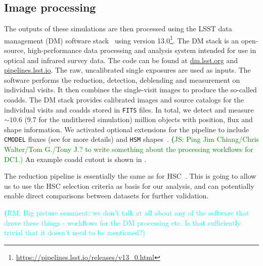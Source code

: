 \documentclass[twocolumn]{aastex62}
\newcommand{\rachel}[1]{{\textcolor{cyan}{{\textbf (RM: #1)}}}}
\newcommand{\js}[1]{{\textcolor{green}{{\textbf (JS: #1)}}}}
\begin{document}
\subsection{Image processing}
\label{sec:image_processing_pipeline}

The outputs of these simulations are then processed using the LSST data management (DM) software stack~\citep{Overview,ScienceBook,WhitePaper,2018PASJ...70S...5B,2015arXiv151207914J} using version 13.0\footnote{\url{https://pipelines.lsst.io/releases/v13_0.html}}. The DM stack is an open-source, high-performance data processing and analysis system intended for use in optical and infrared survey data. The code can be found at \url{dm.lsst.org} and \url{pipelines.lsst.io}. The raw, uncalibrated single exposures are used as inputs. The software performs the reduction, detection, deblending and measurement on individual visits. It then combines the single-visit images to produce the so-called coadds. The DM stack provides calibrated images and source catalogs for the individual visits and coadds stored in \texttt{FITS} files. In total, we detect and measure $\sim 10.6$ (9.7 for the undithered simulation) million objects with position, flux and shape information. We activated optional extensions for the pipeline to include \texttt{CMODEL} fluxes (see \cite{2018PASJ...70S...5B} for more details) and \texttt{HSM} shapes~\citep{2003MNRAS.343..459H,2005MNRAS.361.1287M}.
\js{Ping Jim Chiang/Chris Walter/Tom G./Tony J.? to write something about the processing workflows for DC1.}
An example coadd cutout is shown in .

The reduction pipeline is essentially the same as for HSC~\citep{2018PASJ...70S...5B}. This is going to allow us to use the HSC selection criteria as basis for our analysis, and can potentially enable direct comparisons between datasets for further validation.

\rachel{Big picture comment: we don't talk at all about any of the software that drove these things - workflows for the DM processing etc.  Is that sufficiently trivial that it doesn't need to be mentioned?}
\end{document}
